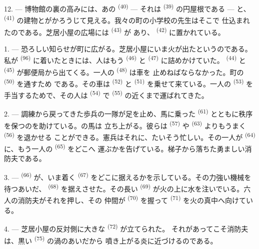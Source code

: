 12. --- 博物館の裏の高みには、あの \textsuperscript{(40)} --- それは
 \textsuperscript{(39)} の円屋根である --- と、
\textsuperscript{(41)} の建物とがかろうじて見える。我々の町の小学校の先生はそこで
仕込まれたのである。芝居小屋の広場には \textsuperscript{(43)} が
あり、 \textsuperscript{(42)} に置かれている。

\VUsaut{5.0mm}
\VUsaut{3.0mm}

\VUsaut{3.4mm}

1. --- 恐ろしい知らせが町に広がる。芝居小屋にいま火が出たというのである。私が
 \textsuperscript{(96)} に着いたときには、人はもう
\textsuperscript{(46)} と \textsuperscript{(47)} に詰めかけていた。
 \textsuperscript{(44)} と \textsuperscript{(45)}
が郵便局から出てくる。一人の \textsuperscript{(48)} は車を
止めねばならなかった。町の \textsuperscript{(50)} を通すため
である。その車は \textsuperscript{(52)} と
\textsuperscript{(51)} を乗せて来ている。一人の \textsuperscript{(53)} を
手当するためで、その人は \textsuperscript{(54)} で
\textsuperscript{(55)} の近くまで運ばれてきた。

2. --- 調練から戻ってきた歩兵の一隊が足を止め、馬に乗った
\textsuperscript{(61)} とともに秩序を保つのを助けている。の馬は
立ち上がる。彼らは \textsuperscript{(57)} や
\textsuperscript{(63)} よりもうまく \textsuperscript{(56)} を退かせる
ことができる。憲兵はそれに、たいそう忙しい。その一人が
\textsuperscript{(64)} に、もう一人の \textsuperscript{(65)} をどこへ
運ぶかを告げている。梯子から落ちた勇ましい消防夫である。

3. ---  \textsuperscript{(66)} が、いま着く
\textsuperscript{(67)} をどこに据えるかを示している。その力強い機械を待つあいだ、
 \textsuperscript{(68)} を据えさせた。その長い
\textsuperscript{(69)} が火の上に水を注いでいる。六人の消防夫がそれを押し、その
仲間が \textsuperscript{(70)} を握って
\textsuperscript{(71)} を火の真中へ向けている。

4. --- 芝居小屋の反対側に大きな \textsuperscript{(72)} が立てられた。
それがあってこそ消防夫は、黒い \textsuperscript{(75)} の渦のあいだから
噴き上がる炎に近づけるのである。

